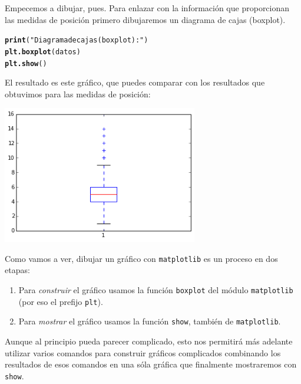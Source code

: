 \documentclass[10pt,a4paper]{article}\usepackage[]{graphicx}\usepackage[]{color}
\makeatletter
\newcommand{\hlstr}[1]{\textcolor[rgb]{0.192,0.494,0.8}{#1}}%
\newcommand{\hlstd}[1]{\textcolor[rgb]{0.345,0.345,0.345}{#1}}%
\newcommand{\hlkwd}[1]{\textcolor[rgb]{0.737,0.353,0.396}{\textbf{#1}}}%
\newenvironment{kframe}{%
 \def\at@end@of@kframe{}%
 \ifinner\ifhmode%
  \def\at@end@of@kframe{\end{minipage}}%
  \begin{minipage}{\columnwidth}%
 \fi\fi%
 \def\FrameCommand##1{\hskip\@totalleftmargin \hskip-\fboxsep
 \colorbox{shadecolor}{##1}\hskip-\fboxsep
     \hskip-\linewidth \hskip-\@totalleftmargin \hskip\columnwidth}%
 \MakeFramed {\advance\hsize-\width
   \@totalleftmargin\z@ \linewidth\hsize
   \@setminipage}}%
 {\par\unskip\endMakeFramed%
 \at@end@of@kframe}
\newenvironment{knitrout}{}{} %
\makeatother
\begin{document}
Empecemos a dibujar, pues. Para enlazar con la información que proporcionan las medidas de posición primero dibujaremos un diagrama de cajas (boxplot).
\begin{knitrout}
\color{fgcolor}\begin{kframe}
\begin{alltt}
\hlkwd{print}\hlstd{(}\hlstr{"Diagrama de cajas (boxplot):"}\hlstd{)}
\hlkwd{plt.boxplot}\hlstd{(datos)}
\hlkwd{plt.show}\hlstd{()}
\end{alltt}
\end{kframe}
\end{knitrout}
El resultado es este gráfico, que puedes comparar con los resultados que obtuvimos para las medidas de posición:
\begin{center}
\includegraphics[height=6cm]{../fig/Tut-02-py-03-boxplot.png}
\end{center}
Como vamos a ver, dibujar un gráfico con {\tt matplotlib} es un proceso en dos etapas:
\begin{enumerate}
\item Para {\em construir} el gráfico usamos la función {\tt boxplot} del módulo {\tt matplotlib} (por eso el prefijo {\tt plt}).
\item Para {\em mostrar} el gráfico usamos la función {\tt show}, también de {\tt matplotlib}.
\end{enumerate}
Aunque al principio pueda parecer complicado, esto nos permitirá más adelante utilizar varios comandos para construir gráficos complicados combinando los resultados de esos comandos en una sóla gráfica que finalmente mostraremos con {\tt show}.
\end{document}

